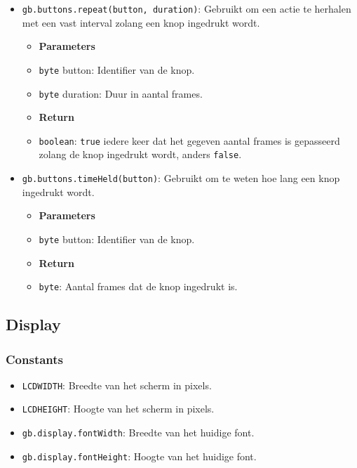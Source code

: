 \documentclass[a4paper,titlepage,12pt]{article}
\begin{document}
\begin{itemize}
		\item \texttt{gb.buttons.repeat(button, duration)}: Gebruikt om een actie te herhalen met een vast interval zolang een knop ingedrukt wordt.
		\begin{itemize}
			\item [] \textbf{Parameters}
			\item \texttt{byte} button: Identifier van de knop.
			\item \texttt{byte} duration: Duur in aantal frames.
		\end{itemize}
		\begin{itemize}
			\item [] \textbf{Return}
			\item \texttt{boolean}: \texttt{true} iedere keer dat het gegeven aantal frames is gepasseerd zolang de knop ingedrukt wordt, anders \texttt{false}.
		\end{itemize}
	
		\item \texttt{gb.buttons.timeHeld(button)}: Gebruikt om te weten hoe lang een knop ingedrukt wordt.
		\begin{itemize}
			\item [] \textbf{Parameters}
			\item \texttt{byte} button: Identifier van de knop.
		\end{itemize}
		\begin{itemize}
			\item [] \textbf{Return}
			\item \texttt{byte}: Aantal frames dat de knop ingedrukt is.
		\end{itemize}
	\end{itemize}


	\subsection{Display}
	\subsubsection{Constants}
	\begin{itemize}
		\item \texttt{LCDWIDTH}: Breedte van het scherm in pixels.
		\item \texttt{LCDHEIGHT}: Hoogte van het scherm in pixels.
		\item \texttt{gb.display.fontWidth}: Breedte van het huidige font.
		\item \texttt{gb.display.fontHeight}: Hoogte van het huidige font.
	\end{itemize}
\end{document}

